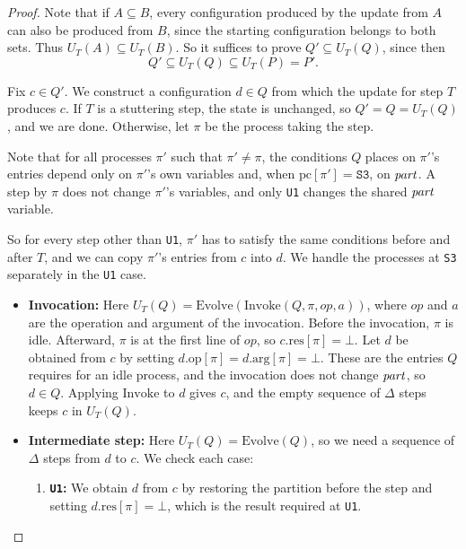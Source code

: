 \documentclass[12pt]{amsproc}
\begin{document}
\begin{enumerate}
\begin{proof}
    Note that if $A\subseteq B$, every configuration produced by the update from $A$ can also be produced from $B$, since the starting configuration belongs to both sets. Thus $U_T(A)\subseteq U_T(B)$. So it suffices to prove $Q'\subseteq U_T(Q)$, since then
    \[
        Q'\subseteq U_T(Q)\subseteq U_T(P)=P'.
    \]

    Fix $c\in Q'$. We construct a configuration $d\in Q$ from which the update for step $T$ produces $c$. If $T$ is a stuttering step, the state is unchanged, so $Q'=Q=U_T(Q)$, and we are done. Otherwise, let $\pi$ be the process taking the step. 
     
    Note that for all processes $\pi'$ such that $\pi'\neq\pi$, the conditions $Q$ places on $\pi'$'s entries depend only on $\pi'$'s own variables and, when $\mathrm{pc}[\pi']=\texttt{S3}$, on $\mathit{part}$. A step by $\pi$ does not change $\pi'$'s variables, and only \texttt{U1} changes the shared $\mathit{part}$ variable.

    So for every step other than \texttt{U1}, $\pi'$ has to satisfy the same conditions before and after $T$, and we can copy $\pi'$'s entries from $c$ into $d$. We handle the processes at \texttt{S3} separately in the \texttt{U1} case.

    \begin{itemize}
        \item \textbf{Invocation:}
        Here $U_T(Q)=\mathrm{Evolve}(\mathrm{Invoke}(Q,\pi,op,a))$, where $op$ and $a$ are the operation and argument of the invocation. Before the invocation, $\pi$ is idle. Afterward, $\pi$ is at the first line of $op$, so $c.\mathrm{res}[\pi]=\bot$. Let $d$ be obtained from $c$ by setting $d.\mathrm{op}[\pi]=d.\mathrm{arg}[\pi]=\bot$. These are the entries $Q$ requires for an idle process, and the invocation does not change $\mathit{part}$, so $d\in Q$. Applying $\mathrm{Invoke}$ to $d$ gives $c$, and the empty sequence of $\Delta$ steps keeps $c$ in $U_T(Q)$.

        \item \textbf{Intermediate step:}
        Here $U_T(Q)=\mathrm{Evolve}(Q)$, so we need a sequence of $\Delta$ steps from $d$ to $c$. We check each case: 

        \begin{enumerate}
            \item \textbf{\texttt{U1}:}
            We obtain $d$ from $c$ by restoring the partition before the step and setting $d.\mathrm{res}[\pi]=\bot$, which is the result required at \texttt{U1}. 
            

\end{enumerate}
\end{itemize}
\end{proof}
\end{enumerate}
\end{document}

